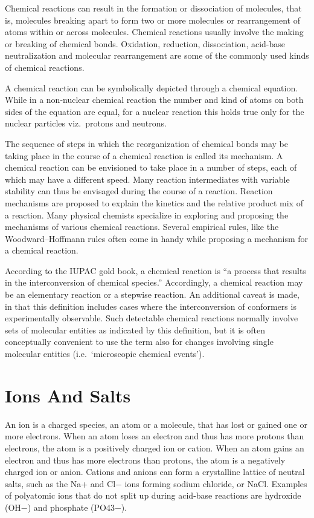 \documentclass[
]{book}
\begin{document}
Chemical reactions can result in the formation or dissociation of molecules, that is, molecules breaking apart to form two or more molecules or rearrangement of atoms within or across molecules. Chemical reactions usually involve the making or breaking of chemical bonds. Oxidation, reduction, dissociation, acid-base neutralization and molecular rearrangement are some of the commonly used kinds of chemical reactions.

A chemical reaction can be symbolically depicted through a chemical equation. While in a non-nuclear chemical reaction the number and kind of atoms on both sides of the equation are equal, for a nuclear reaction this holds true only for the nuclear particles viz.~protons and neutrons.

The sequence of steps in which the reorganization of chemical bonds may be taking place in the course of a chemical reaction is called its mechanism. A chemical reaction can be envisioned to take place in a number of steps, each of which may have a different speed. Many reaction intermediates with variable stability can thus be envisaged during the course of a reaction. Reaction mechanisms are proposed to explain the kinetics and the relative product mix of a reaction. Many physical chemists specialize in exploring and proposing the mechanisms of various chemical reactions. Several empirical rules, like the Woodward--Hoffmann rules often come in handy while proposing a mechanism for a chemical reaction.

According to the IUPAC gold book, a chemical reaction is ``a process that results in the interconversion of chemical species.'' Accordingly, a chemical reaction may be an elementary reaction or a stepwise reaction. An additional caveat is made, in that this definition includes cases where the interconversion of conformers is experimentally observable. Such detectable chemical reactions normally involve sets of molecular entities as indicated by this definition, but it is often conceptually convenient to use the term also for changes involving single molecular entities (i.e.~`microscopic chemical events').

\hypertarget{ions-and-salts}{%
\section{Ions And Salts}\label{ions-and-salts}}

An ion is a charged species, an atom or a molecule, that has lost or gained one or more electrons. When an atom loses an electron and thus has more protons than electrons, the atom is a positively charged ion or cation. When an atom gains an electron and thus has more electrons than protons, the atom is a negatively charged ion or anion. Cations and anions can form a crystalline lattice of neutral salts, such as the Na+ and Cl− ions forming sodium chloride, or NaCl. Examples of polyatomic ions that do not split up during acid-base reactions are hydroxide (OH−) and phosphate (PO43−).
\end{document}
